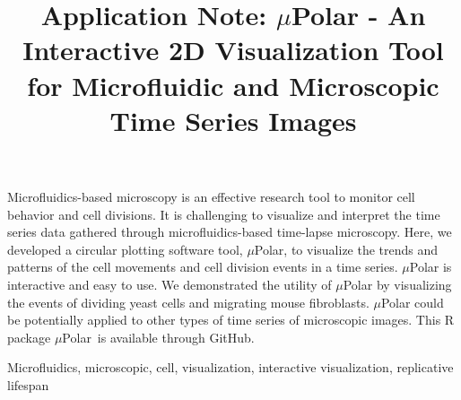 \documentclass[conference]{IEEEtran}
\begin{document}
\title{ Application Note: $\mu$Polar \-- An Interactive 2D Visualization Tool for  Microfluidic and  Microscopic Time Series Images }

 \author{
 \and
{}
 }

\maketitle
\begin{Summary}
Microfluidics-based microscopy is an effective research tool to monitor cell behavior and cell divisions. It is challenging to visualize and interpret the time series data gathered through microfluidics-based time-lapse  microscopy. Here, we developed a circular plotting software tool, $\mu$Polar, to visualize the trends and patterns of the cell movements and cell division events in a time series. $\mu$Polar is interactive and easy to use. We demonstrated the utility of $\mu$Polar by visualizing the events of dividing yeast cells and migrating mouse fibroblasts. $\mu$Polar could be potentially applied to other types of time series of microscopic images. This R package $\mu$Polar\ is available through GitHub.
\end{Summary}


\begin{IEEEkeywords}
Microfluidics, microscopic, cell, visualization, interactive visualization, replicative lifespan 
\end{IEEEkeywords}
\end{document}
